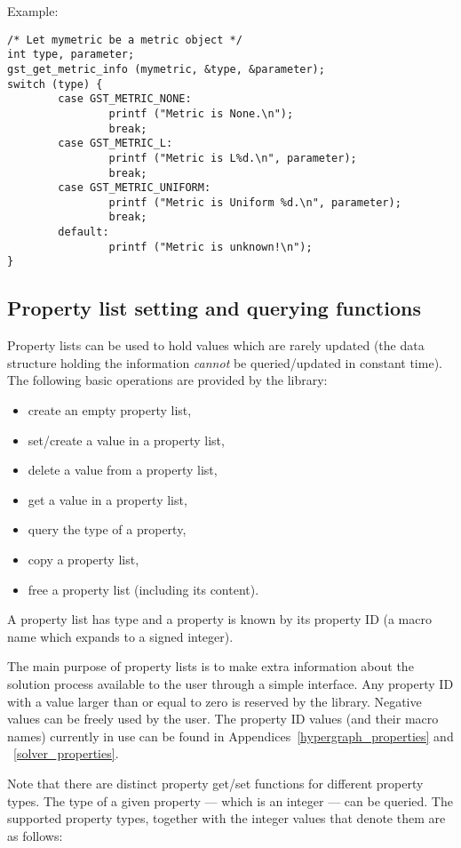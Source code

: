 \bigskip{}Example:
{\footnotesize
\begin{verbatim}
/* Let mymetric be a metric object */
int type, parameter;
gst_get_metric_info (mymetric, &type, &parameter);
switch (type) {
        case GST_METRIC_NONE:
                printf ("Metric is None.\n");
                break;
        case GST_METRIC_L:
                printf ("Metric is L%d.\n", parameter);
                break;
        case GST_METRIC_UNIFORM:
                printf ("Metric is Uniform %d.\n", parameter);
                break;
        default:
                printf ("Metric is unknown!\n");
}
\end{verbatim}
}
\clearpage\subsection{Property list setting and querying functions}
\label{proplist_functions}
Property lists can be used to hold values which are rarely updated (the
data structure holding the information {\em cannot} be queried/updated in
constant time). The following basic operations are provided by the library:
\begin{itemize}
  \item create an empty property list,
  \item set/create a value in a property list,
  \item delete a value from a property list,
  \item get a value in a property list,
  \item query the type of a property,
  \item copy a property list,
  \item free a property list (including its content).
\end{itemize}
A property list has type  and a property is known by
its property ID (a macro name which expands to a signed integer).

The main purpose of property lists is to make extra information about the
solution process available to the user through a simple interface. Any property
ID with a value larger than or equal to zero is reserved by the library.
Negative values can be freely used by the user. The property ID values (and
their macro names) currently in use can be found in
Appendices~\ref{hypergraph_properties} and ~\ref{solver_properties}.

Note that there are distinct property get/set functions for different
property types. The type of a given property --- which is an integer
--- can be queried. The supported property types, together with the
integer values that denote them are as follows:

